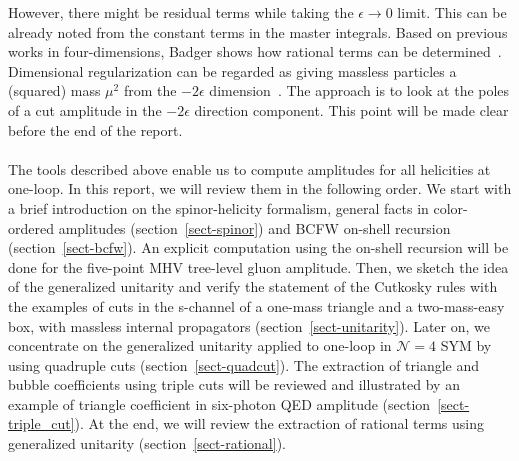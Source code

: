 However, there might be residual terms while taking the $\epsilon\rightarrow 0$ limit. 
This can be already noted from the constant terms in the master integrals.
Based on previous works in four-dimensions, Badger shows how rational terms can be determined~\cite{Badger:2008cm}.
Dimensional regularization can be regarded as giving massless particles a (squared) mass $\mu^2$ from the $-2\epsilon$ dimension~\cite{Bern:1995db}.
The approach is to look at the poles of a cut amplitude in the $-2\epsilon$ direction component.
This point will be made clear before the end of the report.
\\\\
The tools described above enable us to compute amplitudes for all helicities at one-loop.
In this report, we will review them in the following order.
We start with a brief introduction on the spinor-helicity formalism, general facts in color-ordered amplitudes (section~\ref{sect-spinor}) and BCFW on-shell recursion (section~\ref{sect-bcfw}).
An explicit computation using the on-shell recursion will be done for the five-point MHV tree-level gluon amplitude. 
Then, we sketch the idea of the generalized unitarity and verify the statement of the Cutkosky rules with the examples of cuts in the s-channel of a one-mass triangle and a two-mass-easy box, with massless internal propagators (section~\ref{sect-unitarity}).
Later on, we concentrate on the generalized unitarity applied to one-loop in $\mathcal{N}=4$ SYM by using quadruple cuts (section~\ref{sect-quadcut}).
The extraction of triangle and bubble coefficients using triple cuts will be reviewed and illustrated by an example of triangle coefficient in six-photon QED amplitude (section~\ref{sect-triple_cut}).
At the end, we will review the extraction of rational terms using generalized unitarity (section~\ref{sect-rational}).
%
